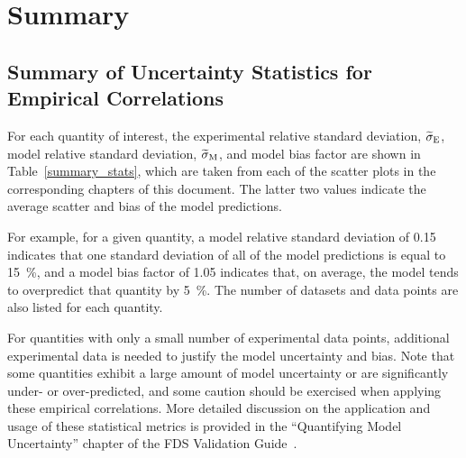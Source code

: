 
\chapter{Summary}
\label{Summary_Chapter}

\section*{Summary of Uncertainty Statistics for Empirical Correlations}

For each quantity of interest, the experimental relative standard deviation, $\widetilde{\sigma}\sb{E}$, model relative standard deviation, $\widetilde{\sigma}\sb{M}$, and model bias factor are shown in Table~\ref{summary_stats}, which are taken from each of the scatter plots in the corresponding chapters of this document. The latter two values indicate the average scatter and bias of the model predictions.

For example, for a given quantity, a model relative standard deviation of 0.15 indicates that one standard deviation of all of the model predictions is equal to 15~\%, and a model bias factor of 1.05 indicates that, on average, the model tends to overpredict that quantity by 5~\%. The number of datasets and data points are also listed for each quantity.

For quantities with only a small number of experimental data points, additional experimental data is needed to justify the model uncertainty and bias. Note that some quantities exhibit a large amount of model uncertainty or are significantly under- or over-predicted, and some caution should be exercised when applying these empirical correlations. More detailed discussion on the application and usage of these statistical metrics is provided in the ``Quantifying Model Uncertainty'' chapter of the FDS Validation Guide~\cite{FDS_Validation_Guide}.

